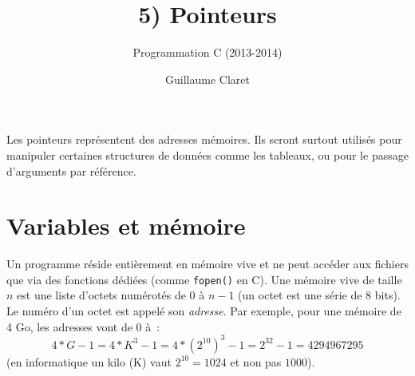 \documentclass[a4paper,10pt]{article}
\begin{document}
  \title{5) Pointeurs}
  \author{Programmation C (2013-2014)}
  \date{Guillaume Claret}
  \maketitle
  
  Les pointeurs représentent des adresses mémoires. Ils seront surtout utilisés pour manipuler certaines structures de données comme les tableaux, ou pour le passage d'arguments par référence.
  
  \section{Variables et mémoire}
  Un programme réside entièrement en mémoire vive et ne peut accéder aux fichiers que via des fonctions dédiées (comme \texttt{fopen()} en C). Une mémoire vive de taille $n$ est une liste d'octets numérotés de $0$ à $n - 1$ (un octet est une série de 8 bits). Le numéro d'un octet est appelé son \emph{adresse}. Par exemple, pour une mémoire de 4 Go, les adresses vont de $0$ à~:
  \[
    4 * G - 1 = 4 * K^3 - 1 = 4 * (2^{10})^3 - 1 = 2^{32} - 1 = 4294967295
  \]
  (en informatique un kilo (K) vaut $2^{10} = 1024$ et non pas $1000$).
  
\end{document}
